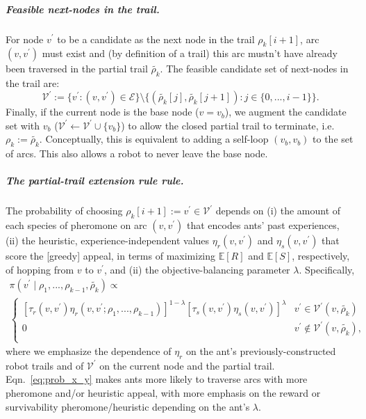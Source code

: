 \documentclass[11pt, oneside]{article}
\begin{document}
\subparagraph{Feasible next-nodes in the trail.}
For node $v^\prime$ to be a candidate as the next node in the trail $\rho_k[i+1]$, arc $(v, v^\prime)$ must exist and (by definition of a trail) this arc mustn't have already been traversed in the partial trail $\tilde{\rho_k}$. 
The feasible candidate set of next-nodes in the trail are:
\begin{equation}
 	\mathcal{V}^\prime := \{ v^\prime : (v, v^\prime ) \in \mathcal{E} \} \setminus \{ (\tilde{\rho_k}[j], \tilde{\rho_k}[j+1]) : j \in \{0,...,i-1\} \}.
\end{equation}
Finally, if the current node is the base node ($v=v_b$), we augment the candidate set with $v_b$ ($\mathcal{V}^\prime \leftarrow \mathcal{V}^\prime \cup \{v_b\}$) to allow the closed partial trail to terminate, i.e. $\rho_k:=\tilde{\rho_k}$. Conceptually, this is equivalent to adding a self-loop $(v_b, v_b)$ to the set of arcs. This also allows a robot to never leave the base node.


\subparagraph{The partial-trail extension rule rule.}
The probability of choosing $\rho_k[i+1]:=v^\prime \in  \mathcal{V}^\prime$ depends on (i) the amount of each species of pheromone on arc $(v, v^\prime)$ that encodes ants' past experiences, (ii) the heuristic, experience-independent values $\eta_r(v, v^\prime)$ and $\eta_s(v, v^\prime)$ that score the [greedy] appeal, in terms of maximizing $\mathbb{E}[R]$ and $\mathbb{E}[S]$, respectively, of hopping from $v$ to $v^\prime$, and (ii) the objective-balancing parameter $\lambda$. Specifically,
\begin{multline}
	\pi(v^\prime \mid \rho_1, ..., \rho_{k-1}, \tilde{\rho_k}) \propto \\
		\begin{cases}
		 \left[\tau_r(v, v^\prime) \eta_r(v, v^\prime; \rho_1, ..., \rho_{k-1}) \right]^{1-\lambda} \left[ \tau_s(v, v^\prime) \eta_s(v, v^\prime) \right]^\lambda & v^\prime \in \mathcal{V}^\prime (v, \tilde{\rho_k}) \\
		 0 & v^\prime \notin \mathcal{V}^\prime (v, \tilde{\rho_k}), \\
		 \end{cases}
	 \label{eq:prob_x_y}
\end{multline}
where we emphasize the dependence of $\eta_r$ on the ant's previously-constructed robot trails and of $\mathcal{V}^\prime$ on the current node and the partial trail.
Eqn.~\ref{eq:prob_x_y} makes ants more likely to traverse arcs with more pheromone and/or heuristic appeal, with more emphasis on the reward or survivability pheromone/heuristic depending on the ant's $\lambda$.
\end{document}
